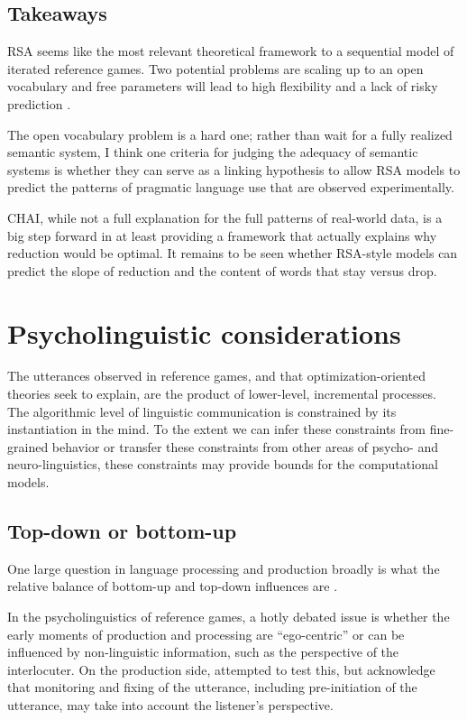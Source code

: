 \documentclass[]{article}
\begin{document}
\subsection{Takeaways}
RSA seems like the most relevant theoretical framework to a sequential model of iterated reference games. Two potential problems are scaling up to an open vocabulary and free parameters will lead to high flexibility and a lack of risky prediction \citep{meehl}.

The open vocabulary problem is a hard one; rather than wait for a fully realized semantic system, I think one criteria for judging the adequacy of semantic systems is whether they can serve as a linking hypothesis to allow RSA models to predict the patterns of pragmatic language use that are observed experimentally. 

CHAI, while not a full explanation for the full patterns of real-world data, is a big step forward in at least providing a framework that actually explains why reduction would be optimal. It remains to be seen whether RSA-style models can predict the slope of reduction and the content of words that stay versus drop. 

\section{Psycholinguistic considerations}


The utterances observed in reference games, and that optimization-oriented theories seek to explain, are the product of lower-level, incremental processes. The algorithmic level of linguistic communication is constrained by its instantiation in the mind. To the extent we can infer these constraints from fine-grained behavior or transfer these constraints from other areas of psycho- and neuro-linguistics, these constraints may provide bounds for the computational models. 

\subsection{Top-down or bottom-up}
One large question in language processing and production broadly is what the relative balance of bottom-up and top-down influences are \citep{gwilliams,tanenhaus1995,horton2005, horton1996}. 

In the psycholinguistics of reference games, a hotly debated issue is whether the early moments of production and processing are ``ego-centric'' or can be influenced by non-linguistic information, such as the perspective of the interlocuter. On the production side, \citet{horton1996} attempted to test this, but acknowledge that monitoring and fixing of the utterance, including pre-initiation of the utterance, may take into account the listener's perspective. %
\end{document}

